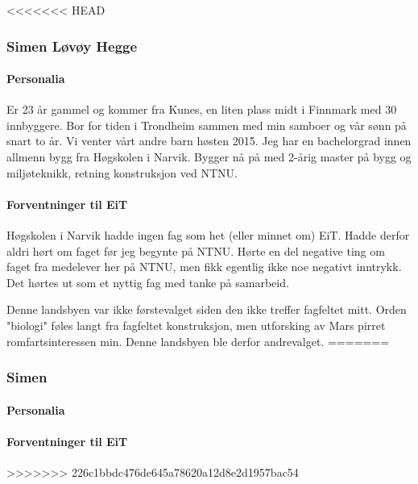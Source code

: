 <<<<<<< HEAD
﻿\subsubsection{Simen Løvøy Hegge}

\paragraph{Personalia}
Er 23 år gammel og kommer fra Kunes, en liten plass midt i Finnmark med 30 innbyggere.
Bor for tiden i Trondheim sammen med min samboer og vår sønn på snart to år.
Vi venter vårt andre barn høsten 2015.
Jeg har en bachelorgrad innen allmenn bygg fra Høgskolen i Narvik.
Bygger nå på med 2-årig master på bygg og miljøteknikk, retning konstruksjon ved NTNU.

\paragraph{Forventninger til EiT}
Høgskolen i Narvik hadde ingen fag som het (eller minnet om) EiT.
Hadde derfor aldri hørt om faget før jeg begynte på NTNU.
Hørte en del negative ting om faget fra medelever her på NTNU, men fikk egentlig ikke noe negativt inntrykk.
Det hørtes ut som et nyttig fag med tanke på samarbeid.

Denne landsbyen var ikke førstevalget siden den ikke treffer fagfeltet mitt.
Orden "biologi" føles langt fra fagfeltet konstruksjon, men utforsking av Mars pirret romfartsinteressen min.
Denne landsbyen ble derfor andrevalget.
=======
\subsubsection{Simen}

\paragraph{Personalia}


\paragraph{Forventninger til EiT}
>>>>>>> 226c1bbdc476de645a78620a12d8e2d1957bac54

